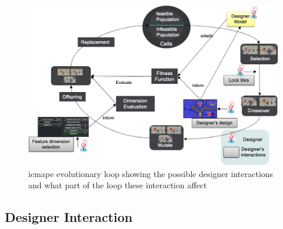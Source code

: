 






\begin{figure}[!h]
\centerline{\includegraphics[width=\textwidth]{figures/EDD-figs/all-designers-interactions.png}}
\caption{\acrshort{icmape} evolutionary loop showing the possible designer interactions and what part of the loop these interaction affect} \label{fig:interactiveMAPE}
\end{figure}

\subsection{Designer Interaction}
\label{sec:desInteraction}

